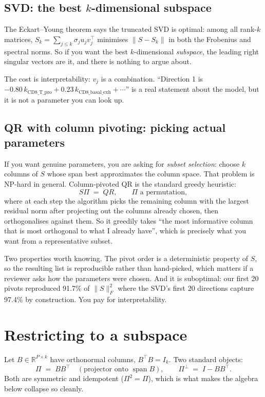 \documentclass[11pt]{article}
\newcommand{\R}{\mathbb{R}}
\begin{document}
\subsection{SVD: the best $k$-dimensional subspace}

The Eckart--Young theorem says the truncated SVD is optimal: among all rank-$k$
matrices, $S_k = \sum_{j\le k}\sigma_j u_j v_j^{\top}$ minimises
$\|S - S_k\|$ in both the Frobenius and spectral norms. So if you want the best
$k$-dimensional \emph{subspace}, the leading right singular vectors are it, and
there is nothing to argue about.

The cost is interpretability: $v_j$ is a combination. ``Direction 1 is
$-0.80\,k_{\text{CD8\_T\_pro}} + 0.23\,k_{\text{CD8\_basal\_exh}} + \cdots$'' is
a real statement about the model, but it is not a parameter you can look up.

\subsection{QR with column pivoting: picking actual parameters}

If you want genuine parameters, you are asking for \emph{subset selection}:
choose $k$ columns of $S$ whose span best approximates the column space. That
problem is NP-hard in general. Column-pivoted QR is the standard greedy
heuristic:
\[
  S \Pi \;=\; QR, \qquad \Pi \text{ a permutation},
\]
where at each step the algorithm picks the remaining column with the largest
residual norm after projecting out the columns already chosen, then
orthogonalises against them. So it greedily takes ``the most informative column
that is most orthogonal to what I already have'', which is precisely what you
want from a representative subset.

Two properties worth knowing. The pivot order is a deterministic property of $S$,
so the resulting list is reproducible rather than hand-picked, which matters if a
reviewer asks how the parameters were chosen. And it is suboptimal: our first 20
pivots reproduced 91.7\% of $\|S\|_F^2$ where the SVD's first 20 directions
capture 97.4\% by construction. You pay for interpretability.

\section{Restricting to a subspace}

Let $B \in \R^{P\times k}$ have orthonormal columns, $B^{\top}B = I_k$. Two
standard objects:
\[
  \Pi \;=\; BB^{\top} \quad (\text{projector onto } \operatorname{span} B),
  \qquad
  \Pi^{\perp} \;=\; I - BB^{\top}.
\]
Both are symmetric and idempotent ($\Pi^2 = \Pi$), which is what makes the
algebra below collapse so cleanly.
\end{document}
